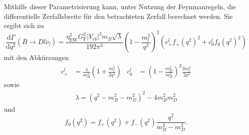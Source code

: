 Mithilfe dieser Parametrisierung kann, unter Nutzung der Feynmanregeln, die differentielle Zerfallsbreite für den betrachteten Zerfall berechnet werden.
Sie ergibt sich zu \cite{PhysRevD.94.094008}
\begin{equation}
  \label{eqn:difzb}
  \frac{\mathrm{d} \Gamma}{\mathrm{d} q^2} \left(\overline{B} \to D l \overline{\nu}_l \right) = \frac{\eta_\text{EW}^2 G_\text{F}^2 \lvert V_{cb} \rvert^2 m_B \sqrt{\lambda} }{192 \pi^3} \left( 1 - \frac{m_l^2}{q^2} \right)^2 \left( c_+^l f_+(q^2)^2 + c_0^l f_0(q^2)^2 \right)
\end{equation}
mit den Abkürzungen
\begin{align*}
  c_+^l &= \frac{\lambda}{m_B^4} \left( 1 + \frac{m_l^2}{2 q^2} \right) & c_0^l &= \left(1 - \frac{m_D^2}{m_B^2} \right)^2 \frac{3 m_l^2}{2 q^2}
\end{align*}
sowie
\begin{align*}
  \lambda = (q^2 - m_B^2 - m_D^2)^2 - 4 m_B^2 m_D^2
\end{align*}
und
\begin{equation}
  \label{eqn:constraint}
  f_0(q^2) = f_+(q^2) + f_{-}(q^2) \frac{q^2}{m_B^2 - m_D^2}.
\end{equation}


